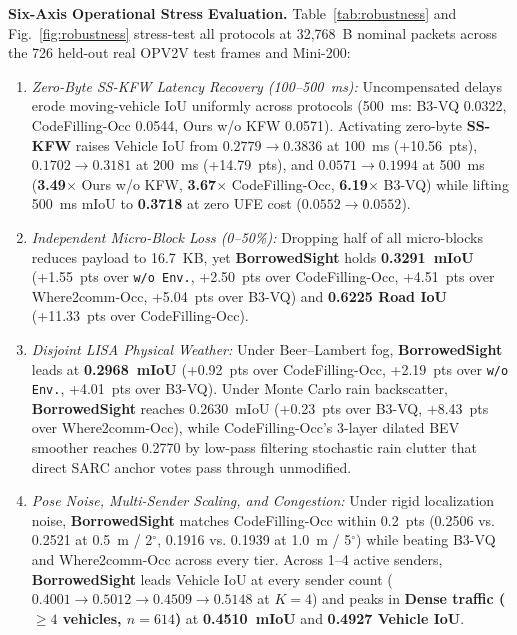 \documentclass[journal]{IEEEtran}
\begin{document}
\textbf{Six-Axis Operational Stress Evaluation.} Table~\ref{tab:robustness} and Fig.~\ref{fig:robustness} stress-test all protocols at 32,768~B nominal packets across the 726 held-out real OPV2V test frames and Mini-200:
\begin{enumerate}
\item \textit{Zero-Byte SS-KFW Latency Recovery (100--500~ms):} Uncompensated delays erode moving-vehicle IoU uniformly across protocols (500~ms: B3-VQ 0.0322, CodeFilling-Occ 0.0544, Ours w/o KFW 0.0571). Activating zero-byte \textbf{SS-KFW} raises Vehicle IoU from $0.2779 \to \mathbf{0.3836}$ at 100~ms (+10.56~pts), $0.1702 \to \mathbf{0.3181}$ at 200~ms (+14.79~pts), and $0.0571 \to \mathbf{0.1994}$ at 500~ms (\textbf{3.49$\times$} Ours w/o KFW, \textbf{3.67$\times$} CodeFilling-Occ, \textbf{6.19$\times$} B3-VQ) while lifting 500~ms mIoU to \textbf{0.3718} at zero UFE cost ($0.0552 \to 0.0552$).
\item \textit{Independent Micro-Block Loss (0--50\%):} Dropping half of all micro-blocks reduces payload to 16.7~KB, yet \textbf{BorrowedSight} holds \textbf{0.3291~mIoU} (+1.55~pts over \texttt{w/o Env.}, +2.50~pts over CodeFilling-Occ, +4.51~pts over Where2comm-Occ, +5.04~pts over B3-VQ) and \textbf{0.6225 Road IoU} (+11.33~pts over CodeFilling-Occ).
\item \textit{Disjoint LISA Physical Weather:} Under Beer--Lambert fog, \textbf{BorrowedSight} leads at \textbf{0.2968~mIoU} (+0.92~pts over CodeFilling-Occ, +2.19~pts over \texttt{w/o Env.}, +4.01~pts over B3-VQ). Under Monte Carlo rain backscatter, \textbf{BorrowedSight} reaches 0.2630~mIoU (+0.23~pts over B3-VQ, +8.43~pts over Where2comm-Occ), while CodeFilling-Occ's 3-layer dilated BEV smoother reaches 0.2770 by low-pass filtering stochastic rain clutter that direct SARC anchor votes pass through unmodified.
\item \textit{Pose Noise, Multi-Sender Scaling, and Congestion:} Under rigid localization noise, \textbf{BorrowedSight} matches CodeFilling-Occ within 0.2~pts (0.2506 vs. 0.2521 at 0.5~m / 2$^\circ$, 0.1916 vs. 0.1939 at 1.0~m / 5$^\circ$) while beating B3-VQ and Where2comm-Occ across every tier. Across 1--4 active senders, \textbf{BorrowedSight} leads Vehicle IoU at every sender count ($0.4001 \to 0.5012 \to 0.4509 \to \mathbf{0.5148}$ at $K=4$) and peaks in \textbf{Dense traffic ($\ge 4$ vehicles, $n=614$)} at \textbf{0.4510~mIoU} and \textbf{0.4927 Vehicle IoU}.
\end{enumerate}
\end{document}
